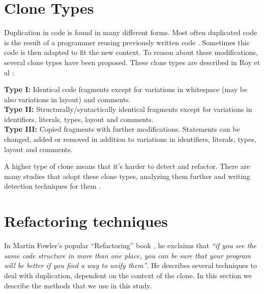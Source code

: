 \section{Clone Types} \label{chap:backgroundclonetypes}
Duplication in code is found in many different forms. Most often duplicated code is the result of a programmer reusing previously written code \cite{haefliger2008code, baxter1998clone}. Sometimes this code is then adapted to fit the new context. To reason about these modifications, several clone types have been proposed. These clone types are described in Roy et al \cite{roy2007survey}:
\begin{displayquote}
\textbf{Type I:} Identical code fragments except for variations in whitespace (may be also variations in layout) and comments.\\
\textbf{Type II:} Structurally/syntactically identical fragments except for variations in identifiers, literals, types, layout and comments.\\
\textbf{Type III:} Copied fragments with further modifications. Statements can be changed, added or removed in addition to variations in identifiers, literals, types, layout and comments.
\end{displayquote}
A higher type of clone means that it's harder to detect and refactor. There are many studies that adopt these clone types, analyzing them further and writing detection techniques for them \cite{sajnani2016sourcerercc, kodhai2010detection, van2019novel}.


\section{Refactoring techniques}
In Martin Fowler's popular ``Refactoring'' book \cite{fowler2018refactoring}, he exclaims that \textit{``if you see the same code structure in more than one place, you can be sure that your program will be better if you find a way to unify them''}. He describes several techniques to deal with duplication, dependent on the context of the clone. In this section we describe the methods that we use in this study.

